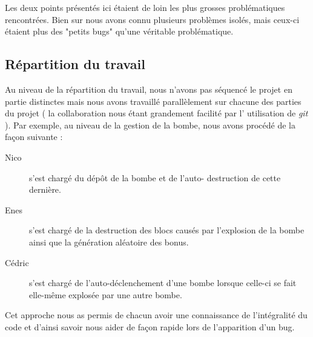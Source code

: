 	Les deux points présentés ici étaient de loin les plus grosses
	problématiques rencontrées. Bien sur nous avons connu plusieurs
	problèmes isolés, mais ceux-ci étaient plus des "petits bugs" 
	qu'une véritable problématique.
	
	
	\subsection{Répartition du travail}
	Au niveau de la répartition du travail, nous n'avons pas 
	séquencé le projet en partie distinctes mais nous avons 
	travaillé parallèlement sur chacune des parties du projet (
	la collaboration nous étant grandement facilité par l'
	utilisation de \textit{git}	). Par exemple, au niveau de la 
	gestion de la bombe, nous avons procédé de la façon suivante :
	\begin{description}
	\item[Nico] s'est chargé du dépôt de la bombe et de l'auto-
	destruction de cette dernière.
	\item[Enes] s'est chargé de la destruction des blocs causés 
	par l’explosion de la bombe ainsi que la génération aléatoire
	des bonus.
	\item[Cédric] s'est chargé de l'auto-déclenchement d'une bombe
	lorsque celle-ci se fait elle-même explosée par une autre 
	bombe.
	\end{description}
	
	Cet approche nous as permis de chacun avoir une connaissance 
	de l'intégralité du code et d'ainsi savoir nous aider de 
	façon rapide lors de l'apparition d'un bug.
	
	














